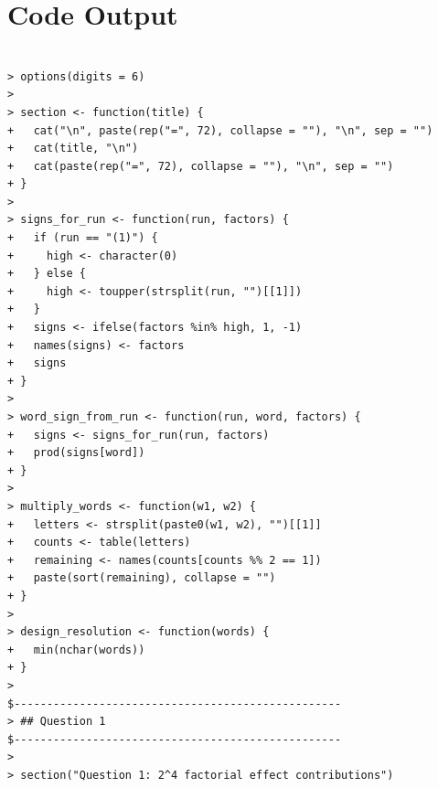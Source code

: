 \documentclass[answers,12pt,addpoints]{exam}
\begin{document}
\section{Code Output}

\begin{verbatim}

> options(digits = 6)
> 
> section <- function(title) {
+   cat("\n", paste(rep("=", 72), collapse = ""), "\n", sep = "")
+   cat(title, "\n")
+   cat(paste(rep("=", 72), collapse = ""), "\n", sep = "")
+ }
> 
> signs_for_run <- function(run, factors) {
+   if (run == "(1)") {
+     high <- character(0)
+   } else {
+     high <- toupper(strsplit(run, "")[[1]])
+   }
+   signs <- ifelse(factors %in% high, 1, -1)
+   names(signs) <- factors
+   signs
+ }
> 
> word_sign_from_run <- function(run, word, factors) {
+   signs <- signs_for_run(run, factors)
+   prod(signs[word])
+ }
> 
> multiply_words <- function(w1, w2) {
+   letters <- strsplit(paste0(w1, w2), "")[[1]]
+   counts <- table(letters)
+   remaining <- names(counts[counts %% 2 == 1])
+   paste(sort(remaining), collapse = "")
+ }
> 
> design_resolution <- function(words) {
+   min(nchar(words))
+ }
> 
$--------------------------------------------------                
> ## Question 1
$--------------------------------------------------                
> 
> section("Question 1: 2^4 factorial effect contributions")


\end{verbatim}
\end{document}
